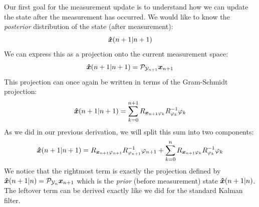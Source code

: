 Our first goal for the measurement update is to understand how we can update the state after the measurement has occurred. We would like to know the \textit{posterior} distribution of the state (after measurement):
$$\bm{\hat{x}}(n+1|n+1)$$
We can express this as a projection onto the current measurement space:
$$\bm{\hat{x}}(n+1|n+1)=\mathcal{P}_{\mathcal{Y}_{n+1}}\bm{x}_{n+1}$$
This projection can once again be written in terms of the Gram-Schmidt projection:
$$\bm{\hat{x}}(n+1|n+1)=\sum_{k=0}^{n+1}R_{\bm{x}_{n+1} \varphi_k} R_{\varphi_{k}}^{-1}\varphi_k$$
As we did in our previous derivation, we will split this sum into two components:
$$\bm{\hat{x}}(n+1|n+1)=R_{\bm{x}_{n+1} \varphi_{n+1}} R_{\varphi_{n+1}}^{-1}\varphi_{n+1}+\sum_{k=0}^{n}R_{\bm{x}_{n+1} \varphi_k} R_{\varphi_{k}}^{-1}\varphi_k$$
We notice that the rightmost term is exactly the projection defined by$\bm{\hat{x}}(n+1|n)=\mathcal{P}_{\mathcal{Y}_{n}}\bm{x}_{n+1}$ which is the \textit{prior} (before measurement) state $\bm{\hat{x}}(n+1|n)$. The leftover term can be derived exactly like we did for the standard Kalman filter.

